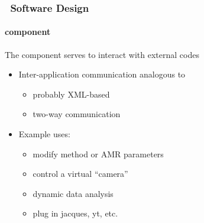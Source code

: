 \begin{frame}[fragile] 
\frametitle{\cello\ Software Design}
\framesubtitle{ component}
The  component serves to interact with external codes \\
\begin{itemize}
\item{} Inter-application communication analogous to 
\begin{itemize}
\item{}    probably XML-based
\item{}    two-way communication
\end{itemize}
\item{} Example uses:
\begin{itemize}
\item{}    modify method or AMR parameters
\item{}    control a virtual ``camera''
\item{}    dynamic data analysis
\item{}    plug in jacques, yt, etc.
\end{itemize}
\end{itemize}
\end{frame}
%
%
%
